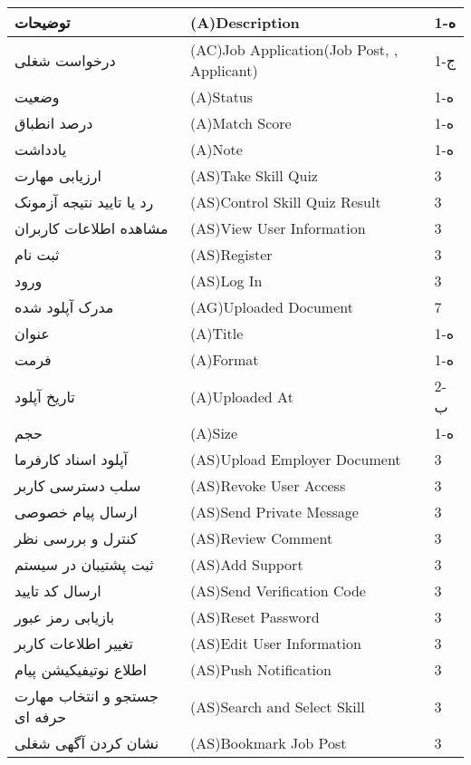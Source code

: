 \documentclass[12pt]{article}
\begin{document}
\begin{center}
\begin{table}[]
\begin{tabular}{|l|l|l|}
				\hline
				توضیحات & (A)Description & 1-ه   \\
				\hline
				درخواست شغلی & (AC)Job Application(Job Post, , Applicant) & 1-ج   \\
				\hline
				وضعیت & (A)ُStatus & 1-ه   \\
				\hline
				درصد انطباق & (A)Match Score & 1-ه   \\
				\hline
				یادداشت & (A)ُNote & 1-ه   \\
				\hline
				ارزیابی مهارت & (AS)Take Skill Quiz & 3     \\
				\hline
				رد یا تایید نتیجه آزمونک & (AS)Control Skill Quiz Result & 3     \\
				\hline
				مشاهده اطلاعات کاربران & (AS)View User Information & 3     \\
				\hline
				ثبت نام & (AS)Register & 3     \\
				\hline
				ورود & (AS)Log In & 3     \\
				\hline
				مدرک آپلود شده & (AG)Uploaded Document & 7     \\
				\hline
				عنوان & (A)Title & 1-ه   \\
				\hline
				فرمت & (A)Format & 1-ه   \\
				\hline
				تاریخ آپلود & (A)Uploaded At & 2-ب   \\
				\hline
				حجم & (A)Size & 1-ه   \\
				\hline
				آپلود اسناد کارفرما & (AS)Upload Employer Document & 3     \\
				\hline
				سلب دسترسی کاربر & (AS)Revoke User Access & 3     \\
				\hline
				ارسال پیام خصوصی & (AS)Send Private Message & 3     \\
				\hline
				کنترل و بررسی نظر & (AS)Review Comment & 3     \\
				\hline
				ثبت پشتیبان در سیستم & (AS)Add Support & 3     \\
				\hline
				ارسال کد تایید & (AS)Send Verification Code & 3     \\
				\hline
				بازیابی رمز عبور‌‌ & (AS)Reset Password & 3     \\
				\hline
				تغییر اطلاعات کاربر & (AS)Edit User Information & 3     \\
				\hline
				اطلاع نوتیفیکیشن پیام & (AS)Push Notification & 3     \\
				\hline
				جستجو و انتخاب مهارت حرفه ای & (AS)Search and Select Skill & 3     \\
				\hline
				نشان کردن آگهی شغلی & (AS)Bookmark Job Post & 3     \\

\end{tabular}
\end{table}
\end{center}
\end{document}
